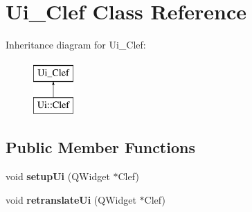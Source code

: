 \hypertarget{class_ui___clef}{}\section{Ui\+\_\+\+Clef Class Reference}
\label{class_ui___clef}
Inheritance diagram for Ui\+\_\+\+Clef\+:\begin{figure}[H]
\begin{center}
\leavevmode
\includegraphics[height=2.000000cm]{class_ui___clef}
\end{center}
\end{figure}
\subsection*{Public Member Functions}
\begin{DoxyCompactItemize}
\item 
\mbox{\label{class_ui___clef_a8d94ebd975febe79d4516f7b05ba5a81}} 
void {\bfseries setup\+Ui} (Q\+Widget $\ast$Clef)
\item 
\mbox{\label{class_ui___clef_afe7c3151f15e3303e0451025d3a82e73}} 
void {\bfseries retranslate\+Ui} (Q\+Widget $\ast$Clef)
\end{DoxyCompactItemize}
